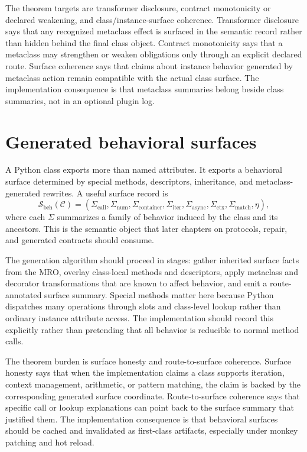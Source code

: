 \documentclass[11pt]{report}
\begin{document}
The theorem targets are transformer disclosure, contract monotonicity or declared weakening, and class/instance-surface coherence. Transformer disclosure says that any recognized metaclass effect is surfaced in the semantic record rather than hidden behind the final class object. Contract monotonicity says that a metaclass may strengthen or weaken obligations only through an explicit declared route. Surface coherence says that claims about instance behavior generated by metaclass action remain compatible with the actual class surface. The implementation consequence is that metaclass summaries belong beside class summaries, not in an optional plugin log.
\section{Generated behavioral surfaces}
 A Python class exports more than named attributes. It exports a behavioral surface determined by special methods, descriptors, inheritance, and metaclass-generated rewrites. A useful surface record is
\[
\mathcal{S}_{\mathrm{beh}}(\mathcal{C}) =
(\Sigma_{\mathrm{call}},\Sigma_{\mathrm{num}},\Sigma_{\mathrm{container}},\Sigma_{\mathrm{iter}},\Sigma_{\mathrm{async}},\Sigma_{\mathrm{ctx}},\Sigma_{\mathrm{match}},\eta),
\]
where each $\Sigma$ summarizes a family of behavior induced by the class and its ancestors. This is the semantic object that later chapters on protocols, repair, and generated contracts should consume.

The generation algorithm should proceed in stages: gather inherited surface facts from the MRO, overlay class-local methods and descriptors, apply metaclass and decorator transformations that are known to affect behavior, and emit a route-annotated surface summary. Special methods matter here because Python dispatches many operations through slots and class-level lookup rather than ordinary instance attribute access. The implementation should record this explicitly rather than pretending that all behavior is reducible to normal method calls.

The theorem burden is surface honesty and route-to-surface coherence. Surface honesty says that when the implementation claims a class supports iteration, context management, arithmetic, or pattern matching, the claim is backed by the corresponding generated surface coordinate. Route-to-surface coherence says that specific call or lookup explanations can point back to the surface summary that justified them. The implementation consequence is that behavioral surfaces should be cached and invalidated as first-class artifacts, especially under monkey patching and hot reload.
\end{document}
